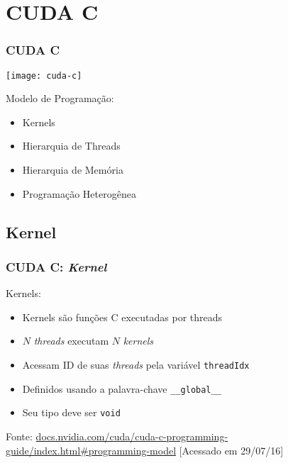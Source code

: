 \documentclass[10pt, compress, aspectratio=43, xcolor={table,usenames,dvipsnames}]{beamer}
\begin{document}
\section{CUDA C}

\begin{frame}
    \frametitle{CUDA C}
    \begin{center}
        \texttt{[image: cuda-c]}
    \end{center}

    Modelo de Programação:
    \begin{itemize}
        \item \alert{Kernels}
        \item Hierarquia de \alert{Threads}
        \item Hierarquia de \alert{Memória}
        \item Programação \alert{Heterogênea}
    \end{itemize}
\end{frame}

\subsection{Kernel}

\begin{frame}
    \frametitle{CUDA C: \textit{Kernel}}
    \alert{Kernels}:
    \begin{itemize}
        \item \alert{Kernels} são funções C executadas por \alert{threads}
        \item $N$ \textit{threads} executam $N$ \textit{kernels}
        \item Acessam \alert{ID} de suas \textit{threads} pela variável \alert{\texttt{threadIdx}}
        \item Definidos usando a palavra-chave \alert{\texttt{\_\_global\_\_}}
        \item Seu tipo deve ser \alert{\texttt{void}}
    \end{itemize}

    \vfill

    \begin{center}
        \tiny{Fonte: \url{docs.nvidia.com/cuda/cuda-c-programming-guide/index.html\#programming-model} [Acessado em 29/07/16]}
    \end{center}
\end{frame}
\end{document}
